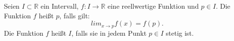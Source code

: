Seien $I \subset \mathbb{R}$ ein Intervall, $f : I \to \mathbb{R}$ eine reellwertige Funktion und $p \in I$. Die Funktion $f$ heißt
 $p$, falls gilt: 
$$lim_{x \to p} f(x) = f(p).$$
Die Funktion $f$ heißt  $I$, falls sie in jedem Punkt $p \in I$ stetig ist.